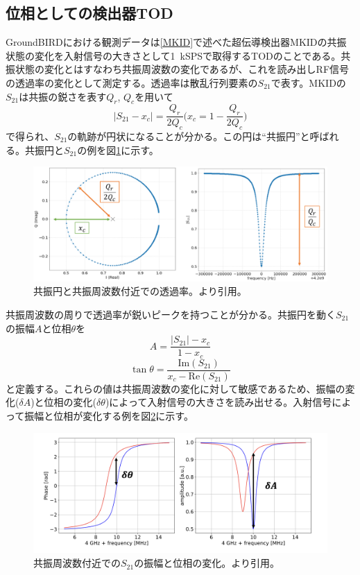 \subsection{位相としての検出器TOD}
GroundBIRDにおける観測データは\ref{MKID}で述べた超伝導検出器MKIDの共振状態の変化を入射信号の大きさとして\SI{1}{kSPS}で取得するTODのことである。共振状態の変化とはすなわち共振周波数の変化であるが、これを読み出しRF信号の透過率の変化として測定する。透過率は散乱行列要素の$S_{21}$で表す。MKIDの$S_{21}$は共振の鋭さを表す$Q_{r}$, $Q_{c}$を用いて
\begin{equation}
  |S_{21}-x_{c}| = \frac{Q_{r}}{2Q_{c}} \bigl(x_{c} = 1-\frac{Q_{r}}{2Q_{c}}\bigr)
\end{equation}
で得られ\cite{muto}、$S_{21}$の軌跡が円状になることが分かる。この円は``共振円''と呼ばれる。共振円と$S_{21}$の例を図\ref{res_circ}に示す。
\begin{figure}[htbp]
  \centering
  \includegraphics[width=1.0\columnwidth]{5_alignment/figs/iq_amp.pdf}
  \caption{共振円と共振周波数付近での透過率。\cite{sueno_master}より引用。}
  \label{res_circ}
\end{figure}
共振周波数の周りで透過率が鋭いピークを持つことが分かる。共振円を動く$S_{21}$の振幅$A$と位相$\theta$を
\begin{equation}
  A = \frac{|S_{21}|- x_{c}}{1-x_{c}}
\end{equation}
\begin{equation}
  \tan\theta = \frac{\mathrm{Im}(S_{21})}{x_{c}- \mathrm{Re}(S_{21})}
\end{equation}
と定義する。これらの値は共振周波数の変化に対して敏感であるため、振幅の変化($\delta A$)と位相の変化($\delta\theta$)によって入射信号の大きさを読み出せる。入射信号によって振幅と位相が変化する例を図\ref{amp_and_phase}に示す。
\begin{figure}[htbp]
  \centering
  \includegraphics[width=1.0\columnwidth]{5_alignment/figs/amp_and_phase.png}
  \caption{共振周波数付近での$S_{21}$の振幅と位相の変化。\cite{sueno_doctor}より引用。}
  \label{amp_and_phase}
\end{figure}

